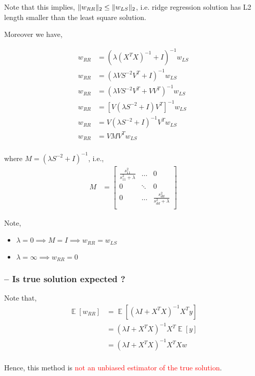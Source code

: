 \documentclass{article}
\DeclareMathOperator*{\E}{\mathop{\mathbb{E}}}
\newcommand{\red}[1]{\textcolor{red}{#1}}
\begin{document}
Note that this implies, $\Vert w_{RR} \Vert_2 \leq \Vert w_{LS} \Vert_2\\$, i.e. ridge regression solution has L2 length smaller than the least square solution.

Moreover we have,

\begin{align*}
    w_{RR} &= (\lambda (X^TX)^{-1} + I)^{-1} w_{LS}\\
    w_{RR} &= (\lambda VS^{-2}V^T + I)^{-1} w_{LS}\\
    w_{RR} &= (\lambda VS^{-2}V^T + VV^T)^{-1} w_{LS}\\
    w_{RR} &= \left[V(\lambda S^{-2} + I)V^T\right]^{-1} w_{LS}\\
    w_{RR} &= V(\lambda S^{-2} + I)^{-1}V^T w_{LS}\\
    w_{RR} &= VMV^T w_{LS}\\
\end{align*}

where $M=(\lambda S^{-2} + I)^{-1}$, i.e., 
\begin{align*}
    M &= \begin{bmatrix}
        \frac{s_{11}^2}{s_{11}^2 + \lambda} & \dots & 0\\
        0 & \ddots & 0\\
        0 & \dots & \frac{s_{dd}^2}{s_{dd}^2 + \lambda}\\
    \end{bmatrix}
\end{align*}

Note,
\begin{itemize}
    \item $\lambda = 0 \implies M=I \implies w_{RR}=w_{LS}$
    \item $\lambda = \infty \implies w_{RR}=0$
\end{itemize}

\subsubsection{-- Is true solution expected ?}

Note that,
\begin{align*}
    \E[w_{RR}] &= \E[(\lambda I + X^TX)^{-1}X^Ty]\\
    &= (\lambda I + X^TX)^{-1}X^T \E[y]\\
    &= (\lambda I + X^TX)^{-1} X^TX w\\
\end{align*}

Hence, this method is \red{not an unbiased estimator of the true solution}.
\end{document}

